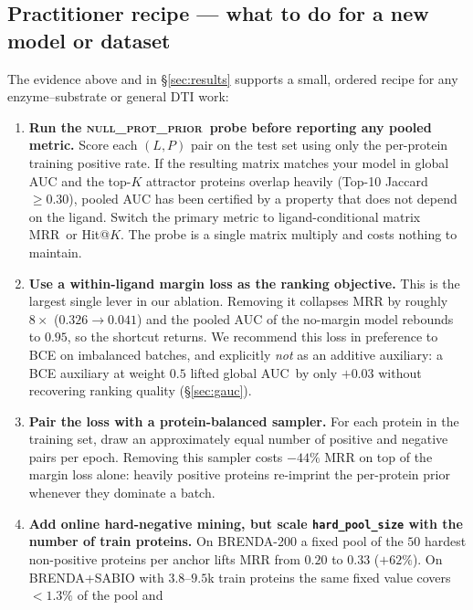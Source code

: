 \documentclass[11pt,a4paper]{article}
\newcommand{\nullprior}{\textsc{null\_prot\_prior}\xspace}
\newcommand{\gauc}{global AUC}
\newcommand{\matmrr}{matrix MRR}
\begin{document}
\subsection{Practitioner recipe --- what to do for a new model or dataset}
\label{sec:recipe}

The evidence above and in \S\ref{sec:results} supports a small, ordered
recipe for any enzyme--substrate or general DTI work:

\begin{enumerate}[leftmargin=*,itemsep=2pt,topsep=2pt]
  \item \textbf{Run the \nullprior\ probe before reporting any pooled
        metric.} Score each $(L, P)$ pair on the test set using only
        the per-protein training positive rate. If the resulting
        matrix matches your model in global AUC and the top-$K$
        attractor proteins overlap heavily (Top-10 Jaccard $\ge 0.30$),
        pooled AUC has been certified by a property that does not
        depend on the ligand. Switch the primary metric to
        ligand-conditional \matmrr\ or Hit@$K$. The probe is a single
        matrix multiply and costs nothing to maintain.
  \item \textbf{Use a within-ligand margin loss as the ranking
        objective.} This is the largest single lever in our ablation.
        Removing it collapses MRR by roughly $8\times$
        ($0.326 \to 0.041$) and the pooled AUC of the no-margin model
        rebounds to $0.95$, so the shortcut returns. We recommend this
        loss in preference to BCE on imbalanced batches, and
        explicitly \emph{not} as an additive auxiliary: a BCE
        auxiliary at weight $0.5$ lifted \gauc\ by only $+0.03$
        without recovering ranking quality (\S\ref{sec:gauc}).
  \item \textbf{Pair the loss with a protein-balanced sampler.} For
        each protein in the training set, draw an approximately equal
        number of positive and negative pairs per epoch. Removing this
        sampler costs $-44\%$ MRR on top of the margin loss alone:
        heavily positive proteins re-imprint the per-protein prior
        whenever they dominate a batch.
  \item \textbf{Add online hard-negative mining, but scale
        \texttt{hard\_pool\_size} with the number of train proteins.}
        On BRENDA-200 a fixed pool of the $50$ hardest non-positive
        proteins per anchor lifts MRR from $0.20$ to $0.33$
        ($+62\%$). On BRENDA+SABIO with $3.8$--$9.5$k train proteins
        the same fixed value covers $<\!1.3\%$ of the pool and

\end{enumerate}
\end{document}

